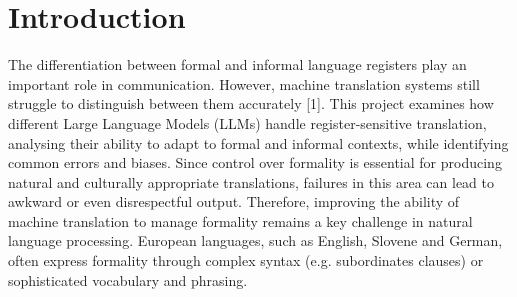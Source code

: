 \documentclass[fleqn,moreauthors,10pt]{ds_report}
\affiliation{\textit{Advisors: Ale\v{s} \v{Z}agar}}
\begin{document}
	
	\flushbottom 
	
	\maketitle 
	
	\thispagestyle{empty} 
	
	
	\section*{Introduction}
	The differentiation between formal and informal language registers play an important role in communication. However, machine translation systems still struggle to distinguish between them accurately [1]. This project examines how different Large Language Models (LLMs) handle register-sensitive translation, analysing their ability to adapt to formal and informal contexts, while identifying common errors and biases. Since control over formality is essential for producing natural and culturally appropriate translations, failures in this area can lead to awkward or even disrespectful output. Therefore, improving the ability of machine translation to manage formality remains a key challenge in natural language processing.
	European languages, such as English, Slovene and German, often express formality through complex syntax (e.g. subordinates clauses) or sophisticated vocabulary and phrasing.
	
\end{document}
